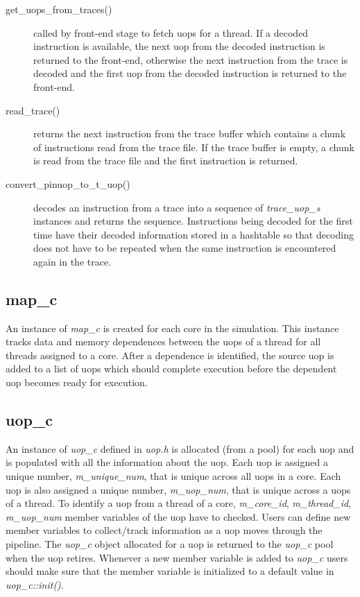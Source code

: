 \begin{description}

\item [get\_uops\_from\_traces()] called by front-end stage to fetch uops for a
thread. If a decoded instruction is available, the next uop from the decoded
instruction is returned to the front-end, otherwise the next instruction from
the trace is decoded and the first uop from the decoded instruction is returned
to the front-end.

\item [read\_trace()] returns the next instruction from the trace buffer which
contains a chunk of instructions read from the trace file. If the trace buffer
is empty, a chunk is read from the trace file and the first instruction is
returned.

\item [convert\_pinuop\_to\_t\_uop()] decodes an instruction from a trace into a
sequence of \textit{trace\_uop\_s} instances and returns the sequence.
Instructions being decoded for the first time have their decoded information
stored in a hashtable so that decoding does not have to be repeated when the
same instruction is encountered again in the trace.

\end{description}


\subsection{map\_c}

An instance of \textit{map\_c} is created for each core in the simulation. This
instance tracks data and memory dependences between the uops of a thread for all
threads assigned to a core. After a dependence is identified, the source uop is
added to a list of uops which should complete execution before the dependent
uop becomes ready for execution.


\subsection{uop\_c}

An instance of \textit{uop\_c} defined in \textit{uop.h} is allocated (from a
  pool) for each uop and is populated with all the information about the uop.
Each uop is assigned a unique number, \textit{m\_unique\_num}, that is unique
across all uops in a core. Each uop is also assigned a unique number,
       \textit{m\_uop\_num}, that is unique across a uops of a thread. To
       identify a uop from a thread of a core, \textit{m\_core\_id},
       \textit{m\_thread\_id}, \textit{m\_uop\_num} member variables of the uop
       have to checked. Users can define new member variables to collect/track
       information as a uop moves through the pipeline. The \textit{uop\_c}
       object allocated for a uop is returned to the \textit{uop\_c} pool when
       the uop retires.  Whenever a new member variable is added to
       \textit{uop\_c} users should make sure that the member variable is
       initialized to a default value in \textit{uop\_c::init()}.


